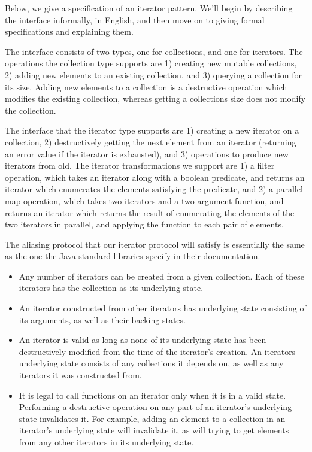Below, we give a specification of an iterator pattern. We'll begin 
by describing the interface informally, in English, and then move on 
to giving formal specifications and explaining them. 

The interface consists of two types, one for collections, and one for
iterators. The operations the collection type supports are 1) creating
new mutable collections, 2) adding new elements to an existing
collection, and 3) querying a collection for its size. Adding new
elements to a collection is a destructive operation which modifies the
existing collection, whereas getting a collections size does not
modify the collection.

The interface that the iterator type supports are 1) creating a new
iterator on a collection, 2) destructively getting the next element
from an iterator (returning an error value if the iterator is
exhausted), and 3) operations to produce new iterators from old. The
iterator transformations we support are 1) a filter operation, which
takes an iterator along with a boolean predicate, and returns an
iterator which enumerates the elements satisfying the predicate, and
2) a parallel map operation, which takes two iterators and a
two-argument function, and returns an iterator which returns the
result of enumerating the elements of the two iterators in parallel,
and applying the function to each pair of elements. 

The aliasing protocol that our iterator protocol will satisfy is
essentially the same as the one the Java standard libraries specify in
their documentation.

\begin{itemize}
\item Any number of iterators can be created from a given collection.
  Each of these iterators has the collection as its underlying state.

\item An iterator constructed from other iterators has underlying 
  state consisting of its arguments, as well as their backing states. 

\item An iterator is valid as long as none of its underlying state has
  been destructively modified from the time of the iterator's creation. An
  iterators underlying state consists of any collections it depends
  on, as well as any iterators it was constructed from.

\item It is legal to call functions on an iterator only when it 
  is in a valid state. Performing a destructive operation on any 
  part of an iterator's underlying state invalidates it. For example,
  adding an element to a collection in an iterator's underlying state
  will invalidate it, as will trying to get elements from any other 
  iterators in its underlying state. 
\end{itemize}

